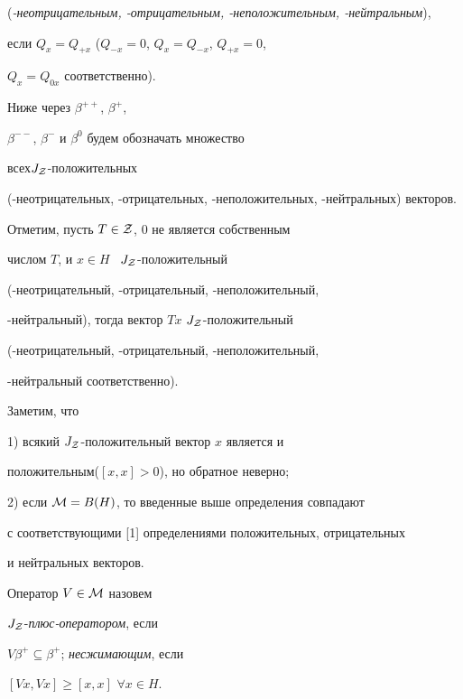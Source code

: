 ({\it -неотрицательным, -отрицательным, -неположительным, -нейтральным}),


если $Q_{x}=Q_{+x}$ ($Q_{-x}=0$, $Q_{x}=Q_{-x}$, $Q_{+x}=0$,


$Q_{x}=Q_{0x}$ соответственно).


Ниже через $\beta^{++}$, $\beta^{+}$,


$\beta^{--}$, $\beta^{-}$ и $\beta^{0}$ будем обозначать множество


всех\linebreak $J_{\cal Z}$-положительных


(-неотрицательных, -отрицательных, -неположительных, -нейтральных) векторов.


Отметим, пусть $T\in {\cal Z}$, $0$ не является собственным 


числом $T$, и $x\in H$ \ $J_{\cal Z}$-положительный


(-неотрицательный, -отрицательный, -неположительный, 


-нейтральный), тогда вектор $Tx$ \linebreak $J_{\cal Z}$-положительный 


(-неотрицательный, -отрицательный, -неположительный, 


-нейтральный соответственно). 





Заметим, что


1) всякий $J_{\cal Z}$-положительный вектор $x$ является и 


положительным\linebreak ($[x,x]>0$), но обратное неверно;


2) если ${\cal M}=B(H)$, то введенные выше определения совпадают 


с соответствующими [1] определениями положительных, отрицательных


и нейтральных векторов. 





 


\begin{defn}


Оператор $V\in \cal M$ назовем


$J_{\cal Z}$-{\it плюс-оператором}, если


$V\beta^{+}\subseteq \beta^{+}$; {\it несжимающим}, если


$[Vx,Vx]\geq [x,x]$ $\forall x\in H$.


\end{defn}





